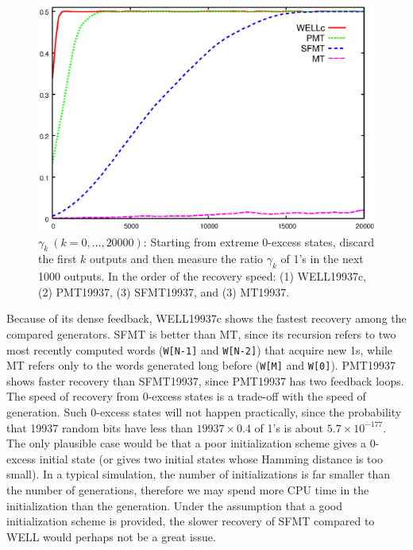 \documentclass{svmult}
\begin{document}
\begin{figure}
\begin{center}
\vskip -3mm
\includegraphics[width=0.7\linewidth]{sfmt-zero.eps}
\end{center}
\caption{$\gamma_k \ (k=0,\ldots,20000)$:
Starting from extreme 0-excess states,
discard the first $k$ outputs and then measure
the ratio $\gamma_k$ of 1's in the next 1000 outputs. 
In the order of the recovery speed: 
(1) WELL19937c, 
(2) PMT19937, (3) SFMT19937, and (3) MT19937.
}\label{fig:zero-recovery}
\end{figure}
Because of its dense feedback, WELL19937c shows
the fastest recovery among the compared generators. 
SFMT is better than MT, since its recursion refers to 
two most recently computed words ({\tt W[N-1]} and {\tt W[N-2]}) 
that acquire new 1s, while
MT refers only to the words generated long before 
({\tt W[M]} and {\tt W[0]}). PMT19937 shows faster recovery 
than SFMT19937, since PMT19937 has two feedback loops.
The speed of recovery from 0-excess states 
is a trade-off 
with the speed of generation. 
Such 0-excess states will not happen practically, 
since the probability 
that 19937 random bits have less than $19937\times 0.4$ of 1's 
is about $5.7\times 10^{-177}$.
The only plausible case would be that
a poor initialization scheme gives a 0-excess initial state
(or gives two initial states whose Hamming distance is too small). 
In a typical simulation, the number of 
initializations is far smaller than the number of generations,
therefore we may spend more CPU time in the initialization
than the generation. Under the assumption that
a good initialization scheme is provided, the slower
recovery of SFMT compared to WELL would perhaps not be
a great issue.
\end{document}
